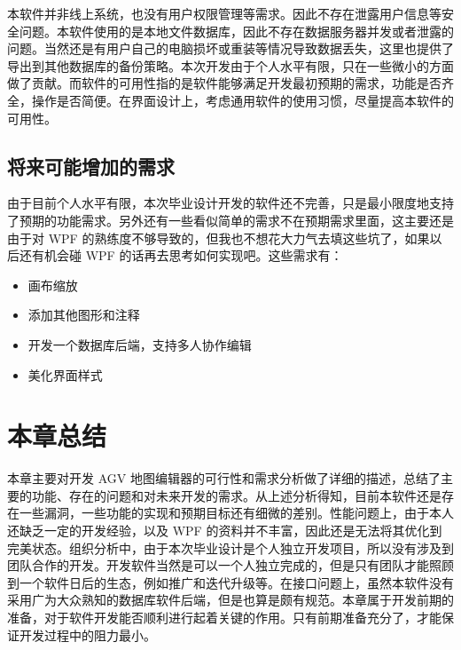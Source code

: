本软件并非线上系统，也没有用户权限管理等需求。因此不存在泄露用户信息等安全问题。本软件使用的是本地文件数据库，因此不存在数据服务器并发或者泄露的问题。当然还是有用户自己的电脑损坏或重装等情况导致数据丢失，这里也提供了导出到其他数据库的备份策略。本次开发由于个人水平有限，只在一些微小的方面做了贡献。而软件的可用性指的是软件能够满足开发最初预期的需求，功能是否齐全，操作是否简便。在界面设计上，考虑通用软件的使用习惯，尽量提高本软件的可用性。

\subsection{将来可能增加的需求}

由于目前个人水平有限，本次毕业设计开发的软件还不完善，只是最小限度地支持了预期的功能需求。另外还有一些看似简单的需求不在预期需求里面，这主要还是由于对 WPF 的熟练度不够导致的，但我也不想花大力气去填这些坑了，如果以后还有机会碰 WPF 的话再去思考如何实现吧。这些需求有：

\begin{itemize}
  \item 画布缩放
  \item 添加其他图形和注释
  \item 开发一个数据库后端，支持多人协作编辑
  \item 美化界面样式
\end{itemize}

\section{本章总结}

本章主要对开发 AGV 地图编辑器的可行性和需求分析做了详细的描述，总结了主要的功能、存在的问题和对未来开发的需求。从上述分析得知，目前本软件还是存在一些漏洞，一些功能的实现和预期目标还有细微的差别。性能问题上，由于本人还缺乏一定的开发经验，以及 WPF 的资料并不丰富，因此还是无法将其优化到完美状态。组织分析中，由于本次毕业设计是个人独立开发项目，所以没有涉及到团队合作的开发。开发软件当然是可以一个人独立完成的，但是只有团队才能照顾到一个软件日后的生态，例如推广和迭代升级等。在接口问题上，虽然本软件没有采用广为大众熟知的数据库软件后端，但是也算是颇有规范。本章属于开发前期的准备，对于软件开发能否顺利进行起着关键的作用。只有前期准备充分了，才能保证开发过程中的阻力最小。
